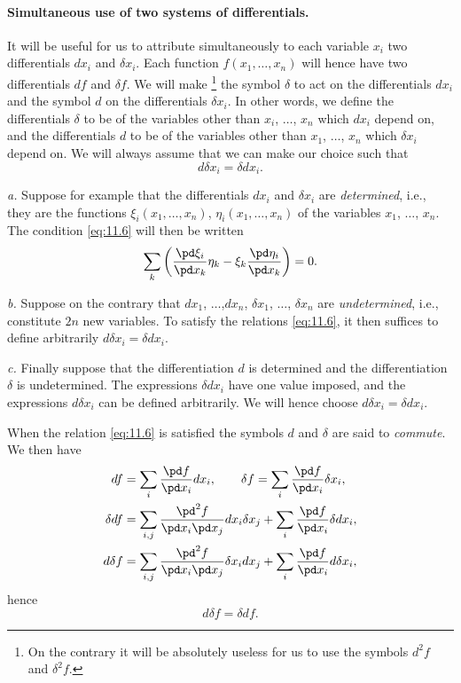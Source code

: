\paragraph{Simultaneous use of two systems of differentials.}
\label{sec:154}
It will be useful for us to attribute simultaneously to each variable $x_{i}$ two differentials $dx_{i}$ and $\delta x_{i}$. Each function $f(x_{1},\dots,x_{n})$ will hence have two differentials $df$ and $\delta f$. We will make \footnote{On the contrary it will be absolutely useless for us to use the symbols $d^{2}f$ and $\delta^{2}f$.} the symbol $\delta$ to act on the differentials $dx_{i}$ and the symbol $d$ on the differentials $\delta x_{i}$. In other words, we define the differentials $\delta$ to be of the variables other than $x_{i}$, $\dots$, $x_{n}$ which $dx_{i}$ depend on, and the differentials $d$ to be of the variables other than $x_{1}$, $\dots$, $x_{n}$ which $\delta x_{i}$ depend on. We will always assume that we can make our choice such that
\begin{equation}
  \label{eq:11.6}
  d\delta x_{i}=\delta d x_{i}.
\end{equation}

\somespace

{\small
\emph{a.} Suppose for example that the differentials $dx_{i}$ and $\delta x_{i}$ are \emph{determined}, i.e., they are the functions $\xi_{i}(x_{1},\dots,x_{n})$, $\eta_{i}(x_{1},\dots,x_{n})$ of the variables $x_{1}$, $\dots$, $x_{n}$. The condition \eqref{eq:11.6} will then be written
\[
\sum_{k}\left(\frac{\pd \xi_{i}}{\pd x_{k}}\eta_{k}-\xi_{k}\frac{\pd \eta_{i}}{\pd x_{k}}\right)=0.
\]

\somespace

\emph{b.} Suppose on the contrary that $dx_{1}$, $\dots$,$ dx_{n}$, $\delta x_{1}$, $\dots$, $\delta x_{n}$ are \emph{undetermined}, i.e., constitute $2n$ new variables. To satisfy the relations \eqref{eq:11.6}, it then suffices to define arbitrarily $d\delta x_{i}=\delta dx_{i}$.

\somespace

\emph{c.} Finally suppose that the differentiation $d$ is determined and the differentiation $\delta$ is undetermined. The expressions $\delta dx_{i}$ have one value imposed, and the expressions $d\delta x_{i}$ can be defined arbitrarily. We will hence choose $d\delta x_{i}=\delta d x_{i}$.
}

\somespace

When the relation \eqref{eq:11.6} is satisfied the symbols $d$ and $\delta$ are said to \emph{commute}. We then have
\begin{align*}
  df&=\sum_{i}\frac{\pd f}{\pd x_{i}}dx_{i},\qquad\delta f=\sum_{i}\frac{\pd f}{\pd x_{i}}\delta x_{i},\\
  \delta df&=\sum_{i,j}\frac{\pd^{2}f}{\pd x_{i}\pd x_{j}}dx_{i}\delta x_{j}+\sum_{i}\frac{\pd f}{\pd x_{i}}\delta d x_{i},\\
  d\delta f&=\sum_{i,j}\frac{\pd^{2}f}{\pd x_{i}\pd x_{j}}\delta x_{i}d x_{j}+\sum_{i}\frac{\pd f}{\pd x_{i}}d\delta  x_{i}, 
\end{align*}
hence
\begin{equation}
  \label{eq:11.7}
  d\delta f=\delta df.
\end{equation}


